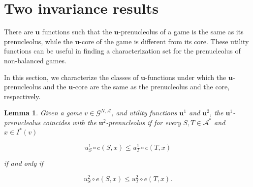 \documentclass[a4paper,12pt]{article}
\newtheorem{lemma}[theorem]{Lemma}
\theoremstyle{definition}
\theoremstyle{remark}
\begin{document}

\section{Two invariance results}\label{sec:invariance}

There are $\mathbf{u}$ functions such that  the $\mathbf{u}$-prenucleolus of a game is the same as its prenucleolus, while the $\mathbf{u}$-core of the game is different from its core. These utility functions can be useful in finding a characterization set for the prenucleolus of non-balanced games. %

In this section, we characterize the classes of $\mathbf{u}$-functions under which the $\mathbf{u}$-prenucleolus and the $\mathbf{u}$-core are the same as the prenucleolus and the core, respectively.

\begin{lemma}\label{lemma:invariance:prenuc}
Given a game $v \in \mathcal{G}^{N,\mathcal{A}}$, and utility functions $\mathbf{u}^1$ and $\mathbf{u}^2$, the $\mathbf{u}^1$-prenucleolus coincides with the $\mathbf{u}^2$-prenucleolus if for every $S, T \in \mathcal{A}^*$ and $x\in I^*(v)$

\begin{equation} \label{eq:lemma_normal}
u^1_S \circ e(S, x) \leq u^1_T \circ e(T, x) 
\end{equation}

\noindent if and only if

\begin{equation} \label{eq:lemma_u}
u^2_S \circ e(S, x) \leq u^2_T \circ e(T, x) .
\end{equation}
\end{lemma}
\end{document}
